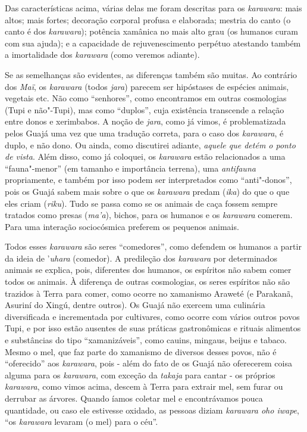 Das características acima, várias delas me foram descritas para os
\emph{karawara}: mais altos; mais fortes; decoração corporal profusa e
elaborada; mestria do canto (o canto é dos \emph{karawara}); potência
xamânica no mais alto grau (os humanos curam com sua ajuda); e a
capacidade de rejuvenescimento perpétuo atestando também a imortalidade
dos \emph{karawara} (como veremos adiante).

Se as semelhanças são evidentes, as diferenças também são muitas. Ao
contrário dos \emph{Maï}, os \emph{karawara} (todos \emph{jara}) parecem
ser hipóstases de espécies animais, vegetais etc. Não como ``senhores'',
como encontramos em outras cosmologias (Tupi e não"-Tupi), mas como
``duplos'', cuja existência transcende a relação entre donos e xerimbabos.
A noção de \emph{jara}, como já vimos, é problematizada pelos Guajá uma
vez que uma tradução correta, para o caso dos \emph{karawara}, é duplo,
e não dono. Ou ainda, como discutirei adiante, \emph{aquele que detém o
ponto de vista}. Além disso, como já coloquei, os \emph{karawara} estão
relacionados a uma ``fauna"-menor'' (em tamanho e importância terrena), uma
\emph{antifauna} propriamente, e também por isso podem ser interpretados
como ``anti"-donos'', pois os Guajá sabem mais sobre o que os
\emph{karawara} predam (\emph{ika}) do que o que eles criam
(\emph{riku}). Tudo se passa como se os animais de caça fossem sempre
tratados como presas (\emph{ma'a}), bichos, para os humanos e os
\emph{karawara} comerem. Para uma interação sociocósmica preferem os
pequenos animais.

Todos esses \emph{karawara} são seres ``comedores'', como defendem os
humanos a partir da ideia de '\emph{uhara} (comedor). A predileção dos
\emph{karawara} por determinados animais se explica, pois, diferentes
dos humanos, os espíritos não sabem comer todos os animais. À diferença
de outras cosmologias, os seres espíritos não são trazidos à Terra para
comer, como ocorre no xamanismo Araweté (e Parakanã, Asuriní do Xingú,
dentre outros). Os Guajá não exercem uma culinária diversificada e
incrementada por cultivares, como ocorre com vários outros povos Tupi, e
por isso estão ausentes de suas práticas gastronômicas e rituais
alimentos e substâncias do tipo ``xamanizáveis'', como cauins, mingaus,
beijus e tabaco. Mesmo o mel, que faz parte do xamanismo de diversos
desses povos, não é ``oferecido'' aos \emph{karawara}, pois - além do fato
de os Guajá não oferecerem coisa alguma para os \emph{karawara}, com
exceção da \emph{takaja} para cantar - os próprios \emph{karawara}, como
vimos acima, descem à Terra para extrair mel, sem furar ou derrubar as
árvores. Quando íamos coletar mel e encontrávamos pouca quantidade, ou
caso ele estivesse oxidado, as pessoas diziam \emph{karawara oho iwape},
``os \emph{karawara} levaram (o mel) para o céu''.

